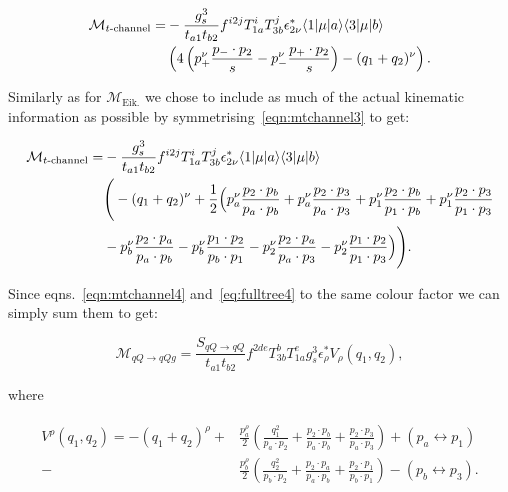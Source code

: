 	\begin{align}
	\begin{split}
		\mathcal{M}_{t\text{-channel}} = &-\frac{g_s^3}{t_{a1}t_{b2}}f^{i2j}T^i_{1a}T^j_{3b} \epsilon^*_{2\nu}
		\langle 1 | \mu | a \rangle\langle 3 | \mu | b \rangle \\&\left(4\left(p_+^\nu \frac{p_-\cdot p_2}{s} - p_-^\nu \frac{p_+\cdot p_2}{s}\right)
		- (q_1 + q_2)^\nu \right).
		\label{eqn:mtchannel3}
	\end{split}
	\end{align}

	Similarly as for $\mathcal{M}_{\text{Eik.}}$ we chose to include as much of the actual
	kinematic information as possible by symmetrising~\eqref{eqn:mtchannel3} to get:

	\begin{align}
	\begin{split}
		\mathcal{M}_{t\text{-channel}} = &-\frac{g_s^3}{t_{a1}t_{b2}}f^{i2j}T^i_{1a}T^j_{3b} \epsilon^*_{2\nu}
		\langle 1 | \mu | a \rangle\langle 3 | \mu | b \rangle\\
		&\Bigg(-(q_1 + q_2)^\nu + \frac{1}{2}\Big(
		p_a^\nu \frac{p_2\cdot p_b}{p_a\cdot p_b} + p_a^\nu \frac{p_2\cdot p_3}{p_a\cdot p_3} +
		p_1^\nu \frac{p_2\cdot p_b}{p_1\cdot p_b} + p_1^\nu \frac{p_2\cdot p_3}{p_1\cdot p_3}  \\
	       &-p_b^\nu \frac{p_2\cdot p_a}{p_a\cdot p_b} - p_b^\nu \frac{p_1\cdot p_2}{p_b\cdot p_1} -
		p_2^\nu \frac{p_2\cdot p_a}{p_a\cdot p_3} - p_2^\nu \frac{p_1\cdot p_2}{p_1\cdot p_3}
		\Big)
		\Bigg).
		\label{eqn:mtchannel4}
	\end{split}
	\end{align}

	Since eqns.~\eqref{eqn:mtchannel4} and~\eqref{eq:fulltree4} to the same colour factor we can simply sum
	them to get:

	\begin{equation}
		\mathcal{M}_{qQ\rightarrow qQg} = \frac{S_{qQ\rightarrow qQ}}{t_{a1}t_{b2}}
		f^{2de}T^b_{3b}T^e_{1a}g_s^3\epsilon^*_\rho V_\rho(q_1, q_2),
	\end{equation}

	where

	\begin{align}
	\begin{split}
		V^\rho(q_1, q_2) = -(q_1 + q_2)^\rho +
		&\frac{p_a^\rho}{2}\left(\frac{q^2_1}{p_a\cdot p_2} + \frac{p_2 \cdot p_b}{p_a \cdot p_b} +
		\frac{p_2 \cdot p_3}{p_a \cdot p_3}\right) + (p_a\leftrightarrow p_1) \\
		- &\frac{p_b^\rho}{2}\left(\frac{q^2_2}{p_b\cdot p_2} + \frac{p_2 \cdot p_a}{p_a \cdot p_b} +
		\frac{p_2 \cdot p_1}{p_b \cdot p_1}\right) - (p_b\leftrightarrow p_3).
		\label{eqn:effVertex}
	\end{split}
	\end{align}


